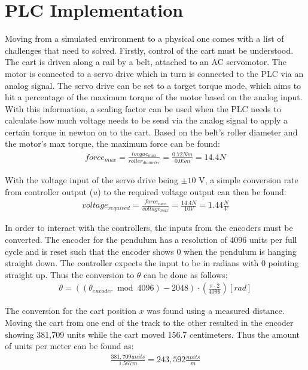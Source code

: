 \chapter{PLC Implementation}
\label{chap:plc implementation}

Moving from a simulated environment to a physical one comes with a list of challenges that need to solved. Firstly, control of the cart must be understood. The cart is driven along a rail by a belt, attached to an AC servomotor. The motor is connected to a servo drive which in turn is connected to the PLC via an analog signal. The servo drive can be set to a target torque mode, which aims to hit a percentage of the maximum torque of the motor based on the analog input. With this information, a scaling factor can be used when the PLC needs to calculate how much voltage needs to be send via the analog signal to apply a certain torque in newton on to the cart. Based on the belt's roller diameter and the motor's max torque, the maximum force can be found:
\begin{align}
	force_{max} = \frac{torque_{max}}{roller_{diameter}} = \frac{0.72 Nm}{0.05 m} = 14.4 N
\end{align}

With the voltage input of the servo drive being $\pm 10$ V, a simple conversion rate from controller output ($u$) to the required voltage output can then be found:
\begin{align}\label{voltageEquation}
	voltage_{required} = \frac{force_{max}}{voltage_{max}} =\frac{14.4N}{10V} = 1.44 \frac{N}{V}
\end{align}

In order to interact with the controllers, the inputs from the encoders must be converted. The encoder for the pendulum has a resolution of 4096 units per full cycle and is reset such that the encoder shows 0 when the pendulum is hanging straight down. The controller expects the input to be in radians with 0 pointing straight up. Thus the conversion to $\theta$ can be done as follows:
\begin{align}\label{PLC theta}
	\theta = ((\theta_{encoder} \bmod{4096}) - 2048) \cdot \left(\frac{\pi \cdot 2}{4096}\right) [rad]
\end{align}

The conversion for the cart position $x$ was found using a measured distance. Moving the cart from one end of the track to the other resulted in the encoder showing 381,709 units while the cart moved 156.7 centimeters. Thus the amount of units per meter can be found as:
\begin{align}
	\frac{381,709 units}{1.567 m} = 243,592 \frac{units}{m}
\end{align}

